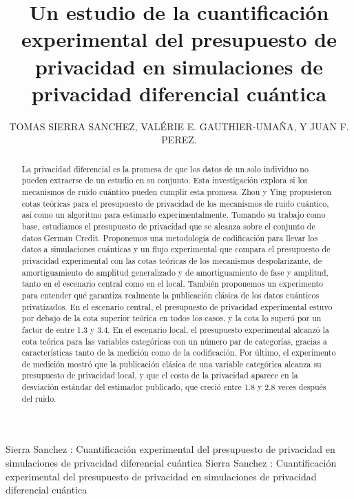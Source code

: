 \documentclass{ieeeaccess}
\begin{document}

\title{Un estudio de la cuantificación experimental del presupuesto de privacidad en simulaciones de privacidad diferencial cuántica}
\author{\uppercase{Tomas Sierra Sanchez},
\uppercase{Valérie E. Gauthier-Umaña, y Juan F. Perez}.}
\address[1]{Departamento de Ingeniería de Sistemas y Computación, Universidad de los Andes (correo: t.sierras@uniandes.edu.co)}
\address[2]{Asesoría de tesis, Departamento de Ingeniería de Sistemas y Computación, Universidad de los Andes, Bogotá D.C., Colombia}
\address[3]{Asesoría de tesis, Departamento de Ingeniería Industrial, Universidad de los Andes, Bogotá D.C., Colombia (correo: jf.perez33@uniandes.edu.co)}

\markboth
{Sierra Sanchez \headeretal: Cuantificación experimental del presupuesto de privacidad en simulaciones de privacidad diferencial cuántica}
{Sierra Sanchez \headeretal: Cuantificación experimental del presupuesto de privacidad en simulaciones de privacidad diferencial cuántica}

\begin{abstract}

La privacidad diferencial es la promesa de que los datos de un solo individuo no pueden extraerse de un estudio en su conjunto. Esta investigación explora si los mecanismos de ruido cuántico pueden cumplir esta promesa. Zhou y Ying propusieron cotas teóricas para el presupuesto de privacidad de los mecanismos de ruido cuántico, así como un algoritmo para estimarlo experimentalmente. Tomando su trabajo como base, estudiamos el presupuesto de privacidad que se alcanza sobre el conjunto de datos German Credit. Proponemos una metodología de codificación para llevar los datos a simulaciones cuánticas y un flujo experimental que compara el presupuesto de privacidad experimental con las cotas teóricas de los mecanismos despolarizante, de amortiguamiento de amplitud generalizado y de amortiguamiento de fase y amplitud, tanto en el escenario central como en el local. También proponemos un experimento para entender qué garantiza realmente la publicación clásica de los datos cuánticos privatizados. En el escenario central, el presupuesto de privacidad experimental estuvo por debajo de la cota superior teórica en todos los casos, y la cota lo superó por un factor de entre 1.3 y 3.4. En el escenario local, el presupuesto experimental alcanzó la cota teórica para las variables categóricas con un número par de categorías, gracias a características tanto de la medición como de la codificación. Por último, el experimento de medición mostró que la publicación clásica de una variable categórica alcanza su presupuesto de privacidad local, y que el costo de la privacidad aparece en la desviación estándar del estimador publicado, que creció entre 1.8 y 2.8 veces después del ruido.

\end{abstract}
\end{document}
